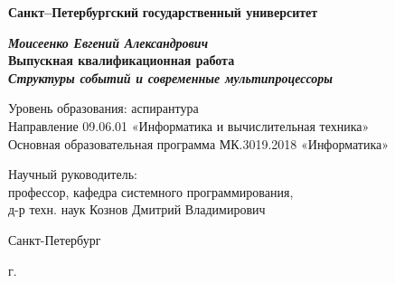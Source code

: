 
\begin{titlepage}
\begin{center}

\textbf{Санкт--Петербургский}
\textbf{государственный университет}

\vspace{35mm}

\textbf{\textit{\large Моисеенко Евгений Александрович}} \\[8mm]
\textbf{\large Выпускная квалификационная работа}\\[3mm]
\textbf{\textit{\large Структуры событий и современные мультипроцессоры}}

\vspace{20mm}
Уровень образования: аспирантура\\
Направление 09.06.01 «Информатика и вычислительная техника»\\
Основная образовательная программа МК.3019.2018 «Информатика»\\


\begin{flushright}
\begin{minipage}[t]{0.7\textwidth}
{Научный руководитель:} \\
профессор, кафедра системного программирования, \\ д-р техн. наук Кознов Дмитрий Владимирович

\vspace{10mm}

\end{minipage}
\end{flushright}

\vfill 

{Санкт-Петербург}
\par{\the\year{} г.}
\end{center}
\end{titlepage}
\restoregeometry
\addtocounter{page}{1}
